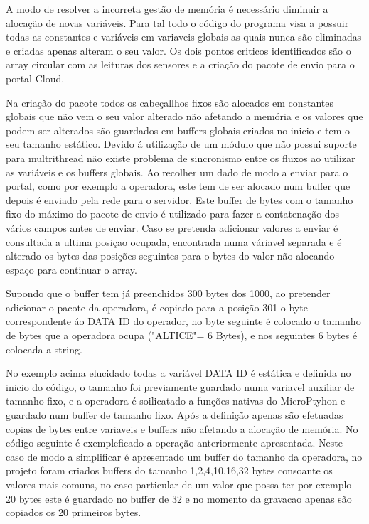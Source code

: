 \par A modo de resolver a incorreta gestão de memória é necessário diminuir a alocação de novas variáveis. Para tal todo o código do programa visa a possuir todas as constantes e variáveis em variaveis globais as quais nunca são eliminadas e criadas apenas alteram o seu valor. Os dois pontos criticos identificados são o array circular com as leituras dos sensores e a criação do pacote de envio para o portal Cloud.
\par Na criação do pacote todos os cabeçallhos fixos são alocados em constantes globais que não vem o seu valor alterado não afetando a memória e os valores que podem ser alterados são guardados em buffers globais criados no inicio e tem o seu tamanho estático. Devido á utilização de um módulo que não possui suporte para multrithread não existe problema de sincronismo entre os fluxos ao utilizar as variáveis e os buffers globais. Ao recolher um dado de modo a enviar para o portal, como por exemplo a operadora, este tem de ser alocado num buffer que depois é enviado pela rede para o servidor. Este buffer de bytes com o tamanho fixo do máximo do pacote de envio é utilizado para fazer a contatenação dos vários campos antes de enviar. Caso se pretenda adicionar valores a enviar é consultada a ultima posiçao ocupada, encontrada numa váriavel separada e é alterado os bytes das posições seguintes para o bytes do valor não alocando espaço para continuar o array.
\par Supondo que o buffer tem já preenchidos 300 bytes dos 1000, ao pretender adicionar o pacote da operadora, é copiado para a posição 301 o byte correspondente áo DATA ID do operador, no byte seguinte é colocado o tamanho de bytes que a operadora ocupa ("ALTICE"= 6 Bytes), e nos seguintes 6 bytes é colocada a string.
\par No exemplo acima elucidado todas a variável DATA ID é estática e definida no inicio do código, o tamanho foi previamente guardado numa variavel auxiliar de tamanho fixo, e a operadora é soilicatado a funções nativas do MicroPtyhon  e guardado num buffer de tamanho fixo. Após a definição apenas são efetuadas copias de bytes entre variaveis e buffers não afetando a alocação de memória. No código seguinte é exempleficado  a operação anteriormente apresentada. Neste caso de modo a simplificar é apresentado um buffer do tamanho da operadora, no projeto foram criados buffers do tamanho 1,2,4,10,16,32 bytes consoante os valores mais comuns, no caso particular de um valor que possa ter por exemplo 20 bytes este é guardado no buffer de 32 e no momento da gravacao apenas são copiados os 20 primeiros bytes.

